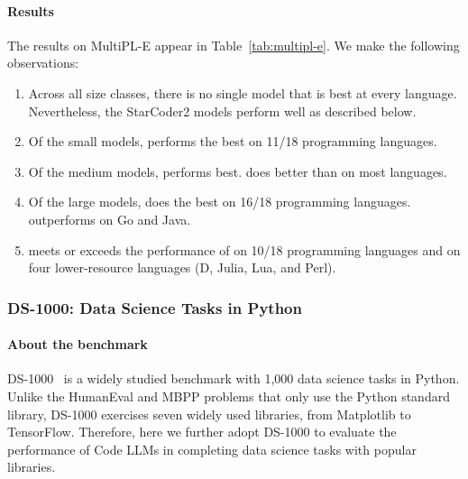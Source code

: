 \documentclass[10pt]{article} %
\begin{document}
\paragraph{Results} The results on MultiPL-E appear in Table~\ref{tab:multipl-e}. We make the following observations:
\begin{enumerate}
    \item Across all size classes, there is no single model that is best at every language. Nevertheless, the StarCoder2 models perform well as described below.
    \item Of the small models,  performs the best on 11/18 programming languages.
    \item Of the medium models,  performs best.  does better than  on most languages.
    \item Of the large models,  does the best on 16/18 programming languages.  outperforms  on Go and Java.
    
    \item {} meets or exceeds the performance of  on 10/18 programming languages and  on four lower-resource languages (D, Julia, Lua, and Perl).

\end{enumerate}



\subsubsection{DS-1000: Data Science Tasks in Python}

\paragraph{About the benchmark} 
DS-1000~\citep{pmlr-v202-lai23b} is a widely studied benchmark with 1,000 data science tasks in Python. Unlike the HumanEval and MBPP problems that only use the Python standard library, DS-1000 exercises seven widely used libraries, from Matplotlib to TensorFlow. Therefore, here we further adopt DS-1000 to evaluate the performance of Code LLMs in completing data science tasks with popular libraries.

\end{document}
